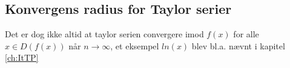 \subsection*{Konvergens radius for Taylor serier} %
Det er dog ikke altid at taylor serien convergere imod $f(x)$ for alle $x \in D(f(x))$ når $n \rightarrow \infty$,
et eksempel $ln(x)$ blev bl.a. nævnt i kapitel \ref{ch:ItTP} 



